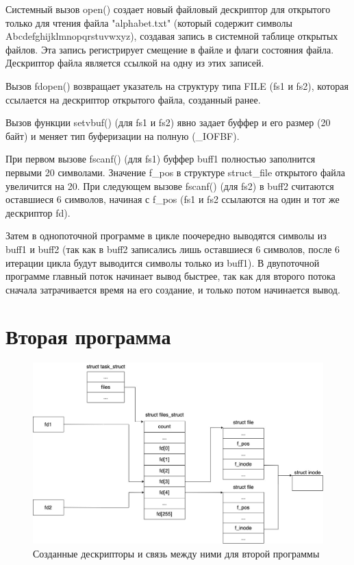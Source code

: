 \documentclass[12pt]{report}
\begin{document}
Системный вызов open() создает новый файловый дескриптор для открытого только для чтения файла "alphabet.txt" (который содержит символы Abcdefghijklmnopqrstuvwxyz), создавая запись в системной таблице открытых файлов. Эта запись регистрирует смещение в файле и флаги состояния файла. Дескриптор файла является ссылкой на одну из этих записей. 

Вызов fdopen() возвращает указатель на структуру типа FILE (fs1 и fs2), которая ссылается на дескриптор открытого файла, созданный ранее. 
	
Вызов функции setvbuf() (для fs1 и fs2)  явно задает буффер и его размер (20 байт) и меняет тип буферизации на полную (\_IOFBF).

При первом вызове fscanf()  (для fs1) буффер buff1 полностью заполнится первыми 20 символами. Значение f\_pos в структуре struct\_file открытого файла увеличится на 20. При следующем вызове fscanf() (для fs2) в buff2 считаются оставшиеся 6 символов, начиная с f\_pos (fs1 и fs2 ссылаются на один и тот же дескриптор fd).


Затем в однопоточной программе в цикле поочередно выводятся символы из buff1 и buff2 (так как в buff2 записались лишь оставшиеся 6 символов, после 6 итерации цикла будут выводится символы только из buff1). В двупоточной программе главный поток начинает вывод быстрее, так как для второго потока сначала затрачивается время на его создание, и только потом начинается вывод.




\chapter{Вторая программа}

\begin{figure}[H]
	\centering
	\includegraphics[scale=0.3]{img/prog_02_schema.jpg}
	\caption{Созданные дескрипторы и связь между ними для второй программы}
	\label{fig:prog_02_schema}
\end{figure}
\end{document}

